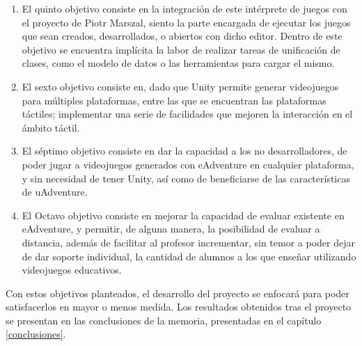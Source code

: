 \begin{enumerate}
	\item El quinto objetivo consiste en la integración de este intérprete de juegos con el proyecto de Piotr Marszal, siento la parte encargada de ejecutar los juegos que sean creados, desarrollados, o abiertos con dicho editor. Dentro de este objetivo se encuentra implícita la labor de realizar tareas de unificación de clases, como el modelo de datos o las herramientas para cargar el mismo.
	
	\item El sexto objetivo consiste en, dado que Unity permite generar videojuegos para múltiples plataformas, entre las que se encuentran las plataformas táctiles; implementar una serie de facilidades que mejoren la interacción en el ámbito táctil.
	
	\item El séptimo objetivo consiste en dar la capacidad a los no desarrolladores, de poder jugar a videojuegos generados con eAdventure en cualquier plataforma, y sin necesidad de tener Unity, así como de beneficiarse de las características de uAdventure.
	
	\item El Octavo objetivo consiste en mejorar la capacidad de evaluar existente en eAdventure, y permitir, de alguna manera, la posibilidad de evaluar a distancia, además de facilitar al profesor incrementar, sin temor a poder dejar de dar soporte individual, la cantidad de alumnos a los que enseñar utilizando videojuegos educativos.
\end{enumerate}

Con estos objetivos planteados, el desarrollo del proyecto se enfocará para poder satisfacerlos en mayor o menos medida. Los resultados obtenidos tras el proyecto se presentan en las conclusiones de la memoria, presentadas en el capítulo \ref{conclusiones}.